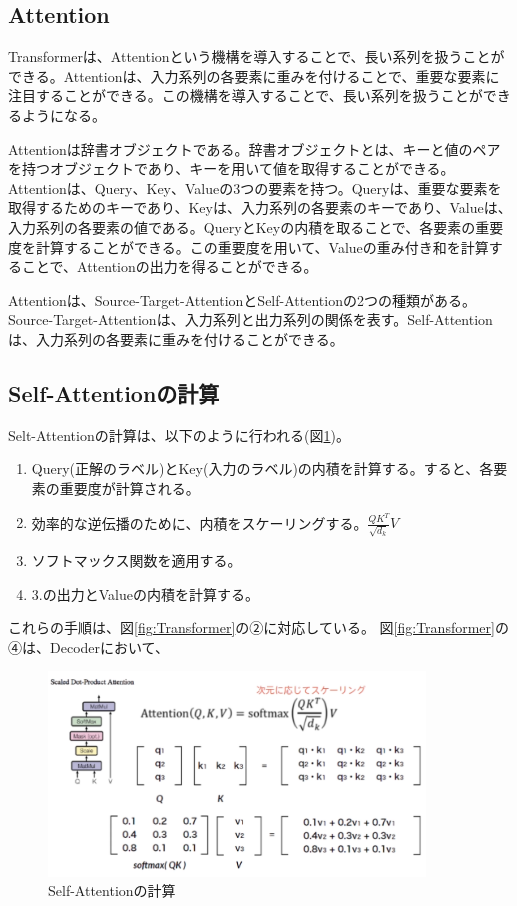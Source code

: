 \documentclass{ltjsarticle}
\begin{document}
\subsection{Attention}
Transformerは、Attentionという機構を導入することで、長い系列を扱うことができる。Attentionは、入力系列の各要素に重みを付けることで、重要な要素に注目することができる。この機構を導入することで、長い系列を扱うことができるようになる。
\par
Attentionは辞書オブジェクトである。辞書オブジェクトとは、キーと値のペアを持つオブジェクトであり、キーを用いて値を取得することができる。Attentionは、Query、Key、Valueの3つの要素を持つ。Queryは、重要な要素を取得するためのキーであり、Keyは、入力系列の各要素のキーであり、Valueは、入力系列の各要素の値である。QueryとKeyの内積を取ることで、各要素の重要度を計算することができる。この重要度を用いて、Valueの重み付き和を計算することで、Attentionの出力を得ることができる。
\par
Attentionは、Source-Target-AttentionとSelf-Attentionの2つの種類がある。Source-Target-Attentionは、入力系列と出力系列の関係を表す。Self-Attentionは、入力系列の各要素に重みを付けることができる。

\subsection{Self-Attentionの計算}
Selt-Attentionの計算は、以下のように行われる(図\ref{fig:Self-Attention})。
\begin{enumerate}
  \item Query(正解のラベル)とKey(入力のラベル)の内積を計算する。すると、各要素の重要度が計算される。
  \item 効率的な逆伝播のために、内積をスケーリングする。\begin{math} \frac{QK^{T}}{\sqrt{d_k}} V \end{math}
  \item ソフトマックス関数を適用する。
  \item 3.の出力とValueの内積を計算する。
\end{enumerate}
これらの手順は、図\ref{fig:Transformer}の②に対応している。
図\ref{fig:Transformer}の④は、Decoderにおいて、

\begin{figure}[htbp]
  \centering
  \includegraphics[width=10cm]{./capture/SelfAttention.png}
  \caption{Self-Attentionの計算}
  \label{fig:Self-Attention}
\end{figure}
\end{document}
